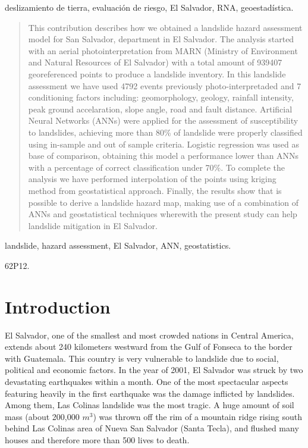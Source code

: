 \documentclass[11pt,twoside]{rmta2010esp}%
\begin{document}
\PC deslizamiento de tierra, evaluación de riesgo, El Salvador, RNA, geoestadística.

\begin{abstract}
This contribution describes how we obtained a landslide hazard
assessment model for San Salvador, department in El Salvador. The analysis started with an aerial photointerpretation from  MARN (Ministry of Environment and Natural Resources of El Salvador)  with a total amount of 939407 georeferenced points to produce a landslide inventory. In this
landslide assessment we have used 4792 events previously photo-interpretaded
and 7 conditioning factors including: geomorphology, geology, rainfall intensity, peak ground accelaration, slope angle, road and fault distance. Artificial
Neural Networks (ANNs) were applied for the assessment of susceptibility to
landslides, achieving more than 80\% of landslide were properly classified using
in-sample and out of sample criteria. Logistic regression was used as base of
comparison, obtaining this model a performance lower than ANNs with a percentage of correct classification under 70\%. To complete the analysis we have
performed interpolation of the points using kriging method from geostatistical
approach. Finally, the results show that is possible to derive a landslide hazard map, making use of a combination of ANNs and geostatistical techniques
wherewith the present study can help landslide mitigation in El Salvador.
\end{abstract}

\KW landslide, hazard assessment, El Salvador, ANN, geostatistics.

\AMS 62P12.%



\section{Introduction}
\label{sec:intr}
El Salvador, one of the smallest and most crowded nations in Central America, extends about 240 kilometers westward from the 
Gulf of Fonseca to the border with Guatemala. This country is very vulnerable to landslide due to social, political and economic factors.
In the year of 2001, El Salvador was struck by two devastating earthquakes within a month. One of the most spectacular aspects featuring 
heavily in the first earthquake was the damage inflicted by landslides. Among them, Las Colinas landslide was the most tragic.
A huge amount of soil mass (about 200,000 $m^{3}$) was thrown off the rim of a mountain ridge rising south behind Las Colinas area 
of Nueva San Salvador (Santa Tecla), and flushed many houses and therefore more than 500 lives to death.
\end{document}
